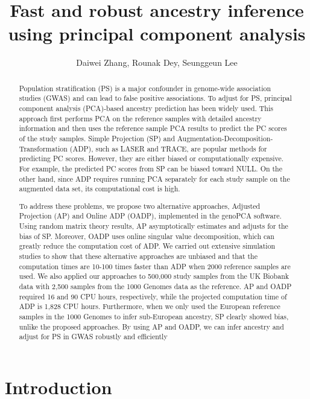\documentclass{article}
\title{
  Fast and robust ancestry inference
  using principal component analysis
}
\author{Daiwei Zhang, Rounak Dey, Seunggeun Lee}
\date{}
\begin{document}
\maketitle

\begin{abstract}
    
 Population stratification (PS) is a major confounder in genome-wide association studies (GWAS) and can lead to false positive associations. To adjust for PS, principal component analysis (PCA)-based ancestry prediction has been widely used. This approach first performs PCA on the reference samples with detailed ancestry information and then uses the reference sample PCA results to predict the PC scores of the study samples. Simple Projection (SP) and Augmentation-Decomposition-Transformation (ADP), such as LASER and TRACE, are popular methods for predicting PC scores. However, they are either biased or computationally expensive. For example, the predicted PC scores from SP can be biased toward NULL. On the other hand, since ADP requires running PCA separately for each study sample on the augmented data set, its computational cost is high.

To address these problems, we propose two alternative approaches, Adjusted Projection (AP) and Online ADP (OADP), implemented in the genoPCA software. Using random matrix theory results, AP asymptotically estimates and adjusts for the bias of SP. Moreover, OADP uses online singular value decomposition, which can greatly reduce the computation cost of ADP. We carried out extensive simulation studies to show that these alternative approaches are unbiased and that the computation times are 10-100 times faster than ADP when 2000 reference samples are used. We also applied our approaches to 500,000 study samples from the UK Biobank data with 2,500 samples from the 1000 Genomes data as the reference. AP and OADP required 16 and 90 CPU hours, respectively, while the projected computation time of ADP is 1,828 CPU hours. Furthermore, when we only used the European reference samples in the 1000 Genomes to infer sub-European ancestry, SP clearly showed bias, unlike the proposed approaches. By using AP and OADP, we can infer ancestry and adjust for PS in GWAS robustly and efficiently   
    
\end{abstract}

\section{Introduction}
\end{document}
